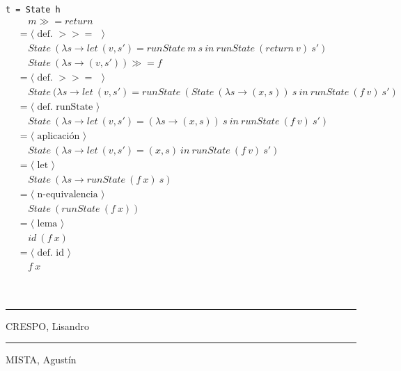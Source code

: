 \documentclass[a4paper,10pt]{article}
\begin{document}
	\\
	\\ \texttt{t = State h}
	\begin{align*}
  	&\ \ \ \ \ m \gg= return
  	\\ &=\langle \text{ def. $>>=$ }\rangle
  	\\ &\ \ \ \ \ State\ (\lambda s \rightarrow let\ (v,s')=runState\ m\ s\ in\ runState\ (return\ v)\ s')
  	\\ &\ \ \ \ \ State\ (\lambda s \rightarrow (v, s')) \gg= f
  	\\ &=\langle \text{ def. $>>=$ }\rangle
  	\\ &\ \ \ \ \ State\ (\lambda s \rightarrow let\ (v,s')=runState\ (State\ (\lambda s \rightarrow (x, s))\ s\ in\ runState\ (f\ v)\ s')
  	\\ &=\langle \text{ def. runState }\rangle
  	\\ &\ \ \ \ \ State\ (\lambda s \rightarrow let\ (v,s')=(\lambda s \rightarrow (x, s))\ s\ in\ runState\ (f\ v)\ s')
  	\\ &=\langle \text{ aplicación }\rangle
  	\\ &\ \ \ \ \ State\ (\lambda s \rightarrow let\ (v,s')=(x, s)\ in\ runState\ (f\ v)\ s')
  	\\ &=\langle \text{ let }\rangle
  	\\ &\ \ \ \ \ State\ (\lambda s \rightarrow runState\ (f\ x)\ s)
  	\\ &=\langle \text{ n-equivalencia }\rangle
  	\\ &\ \ \ \ \ State\ (runState\ (f\ x))
  	\\ &=\langle \text{ lema }\rangle
  	\\ &\ \ \ \ \ id\ (f\ x)
  	\\ &=\langle \text{ def. id }\rangle
  	\\ &\ \ \ \ \ f\ x
  	\end{align*}
	\\
	\pagebreak
\\
\vspace{\fill}
\begin{multicols}{2}
	\hrule
	\vspace{5pt}
	CRESPO, Lisandro \\
	\linebreak
	\hrule
	\vspace{5pt}
	MISTA, Agustín \\
\end{multicols}
\end{document}
